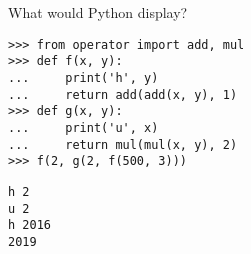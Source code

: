 \question What would Python display?

\begin{lstlisting}
>>> from operator import add, mul
>>> def f(x, y):
...     print('h', y)
...     return add(add(x, y), 1)
>>> def g(x, y):
...     print('u', x)
...     return mul(mul(x, y), 2)
>>> f(2, g(2, f(500, 3)))
\end{lstlisting}

\begin{solution}[1in]
\begin{lstlisting}
h 2
u 2
h 2016
2019
\end{lstlisting}
\end{solution}
